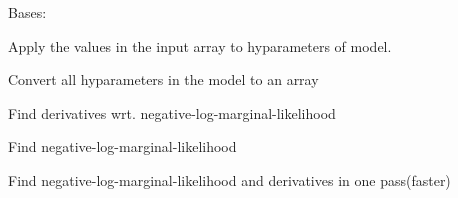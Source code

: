 \documentclass[letterpaper,10pt,english]{sphinxmanual}
\begin{document}
\begin{fulllineitems}
\label{pyGPs.Core:pyGPs.Core.opt.Optimizer}
Bases: 

\begin{fulllineitems}
\label{pyGPs.Core:pyGPs.Core.opt.Optimizer.apply_in_objects}
Apply the values in the input array to hyparameters of model.

\end{fulllineitems}


\begin{fulllineitems}
\label{pyGPs.Core:pyGPs.Core.opt.Optimizer.convert_to_array}
Convert all hyparameters in the model to an array

\end{fulllineitems}


\begin{fulllineitems}
\label{pyGPs.Core:pyGPs.Core.opt.Optimizer.dnlml}
Find derivatives wrt. negative-log-marginal-likelihood

\end{fulllineitems}


\begin{fulllineitems}
\label{pyGPs.Core:pyGPs.Core.opt.Optimizer.nlml}
Find negative-log-marginal-likelihood

\end{fulllineitems}


\begin{fulllineitems}
\label{pyGPs.Core:pyGPs.Core.opt.Optimizer.nlzAnddnlz}
Find negative-log-marginal-likelihood and derivatives in one pass(faster)

\end{fulllineitems}


\end{fulllineitems}
\end{document}
